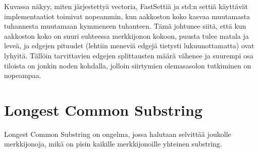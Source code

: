 \documentclass{article}
\begin{document}
            Kuvassa näkyy, miten järjestettyä vectoria, FastSettiä ja std:n settiä käyttävät implementaatiot toimivat nopeammin,
            kun aakkoston koko kasvaa muutamasta tuhannesta muutamaan kymmeneen tuhanteen. Tämä johtunee siitä, että kun aakkoston
            koko on suuri suhteessa merkkijonon kokoon, puusta tulee matala ja leveä, ja edgejen pituudet (lehtiin meneviä edgejä
            tietysti lukuunottamatta) ovat lyhyitä. Tällöin tarvittavien edgejen splittausten määrä vähenee ja suurempi osa tiloista
            on jonkin noden kohdalla, jolloin siirtymien olemasasolon tutkiminen on nopeampaa.
            

    \section{Longest Common Substring}
        Longest Common Substring on ongelma, jossa halutaan selvittää joukolle merkkijonoja, mikä on pisin kaikille merkkijonoille
        yhteinen substring. 
\end{document}
